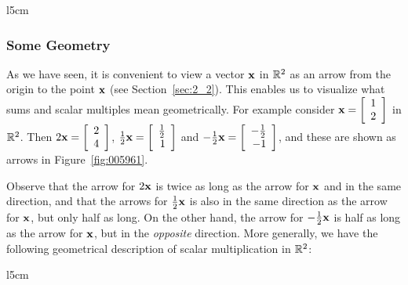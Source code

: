 \begin{wrapfigure}{l}{5cm} 
\centering

\caption{\label{fig:005961}}
\end{wrapfigure}

\subsubsection*{Some Geometry}
\vspace{-1em}

As we have seen, it is convenient to view a vector $\textbf{x}$ in $\mathbb{R}^2$ as an arrow from the origin to the point $\textbf{x}$ (see Section~\ref{sec:2_2}). This enables us to visualize what sums and scalar multiples mean geometrically. For example consider $\textbf{x} = \left[ \begin{array}{rr}
1 \\
2
\end{array} \right]$
 in $\mathbb{R}^2$. Then $2\textbf{x} = \left[ \begin{array}{rr}
 2 \\
 4
 \end{array} \right]$, $\tfrac{1}{2}\textbf{x} = \left[ \begin{array}{rr}
 \tfrac{1}{2} \\
 1
 \end{array} \right]$
 and $-\tfrac{1}{2}\textbf{x} = \left[ \begin{array}{rr}
 -\tfrac{1}{2} \\
 -1
 \end{array} \right]$, and these are shown as arrows in Figure~\ref{fig:005961}. 

Observe that the arrow for $2\textbf{x}$ is twice as long as the arrow for $\textbf{x}$ and in the same direction, and that the arrows for $\tfrac{1}{2}\textbf{x}$ is also in the same direction as the arrow for $\textbf{x}$, but only half as long. On the other hand, the arrow for $-\tfrac{1}{2}\textbf{x}$ is half as long as the arrow for $\textbf{x}$, but in the \textit{opposite} direction. More generally, we have the following geometrical description of scalar multiplication in $\mathbb{R}^2$:

 \begin{wrapfigure}[2]{l}{5cm} 
 \vspace*{-2em}
 \centering
 
 \caption{\label{fig:005971}}
 \end{wrapfigure}

